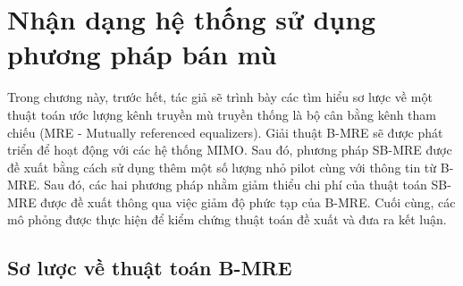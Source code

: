 \clearpage
{}

\setcounter{chapter}{1}
\chapter[{NHẬN DẠNG HỆ THỐNG SỬ DỤNG PHƯƠNG PHÁP BÁN MÙ}]{Nhận dạng hệ thống sử dụng phương pháp bán mù}
\label{sec:MRE}

Trong chương này, trước hết, tác giả sẽ trình bày các tìm hiểu sơ lược về một thuật toán ước lượng kênh truyền mù truyền thống là bộ cân bằng kênh tham chiếu (MRE - Mutually referenced equalizers). Giải thuật B-MRE sẽ được phát triển để hoạt động với các hệ thống MIMO. Sau đó, phương pháp SB-MRE được đề xuất bằng cách sử dụng thêm một số lượng nhỏ pilot cùng với thông tin từ B-MRE. Sau đó, các hai phương pháp nhằm giảm thiểu chi phí của thuật toán SB-MRE được đề xuất thông qua việc giảm độ phức tạp của B-MRE. Cuối cùng, các mô phỏng được thực hiện để kiểm chứng thuật toán đề xuất và đưa ra kết luận.

\section{Sơ lược về thuật toán B-MRE}

